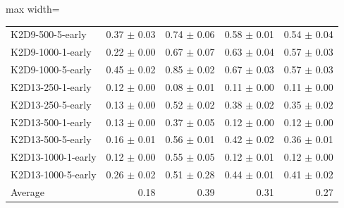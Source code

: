 \documentclass{article}
\begin{document}
\begin{table}[ht]
\begin{center}
\begin{small}
\begin{adjustbox}{max width=\columnwidth}
\begin{tabular}{l|rrrr}
K2D9-500-5-early & 0.37 $\pm$ 0.03 & 0.74 $\pm$ 0.06 & 0.58 $\pm$ 0.01 & 0.54 $\pm$ 0.04\\
K2D9-1000-1-early & 0.22 $\pm$ 0.00 & 0.67 $\pm$ 0.07 & 0.63 $\pm$ 0.04 & 0.57 $\pm$ 0.03\\
K2D9-1000-5-early & 0.45 $\pm$ 0.02 & 0.85 $\pm$ 0.02 & 0.67 $\pm$ 0.03 & 0.57 $\pm$ 0.03\\
K2D13-250-1-early & 0.12 $\pm$ 0.00 & 0.08 $\pm$ 0.01 & 0.11 $\pm$ 0.00 & 0.11 $\pm$ 0.00\\
K2D13-250-5-early & 0.13 $\pm$ 0.00 & 0.52 $\pm$ 0.02 & 0.38 $\pm$ 0.02 & 0.35 $\pm$ 0.02\\
K2D13-500-1-early & 0.13 $\pm$ 0.00 & 0.37 $\pm$ 0.05 & 0.12 $\pm$ 0.00 & 0.12 $\pm$ 0.00\\
K2D13-500-5-early & 0.16 $\pm$ 0.01 & 0.56 $\pm$ 0.01 & 0.42 $\pm$ 0.02 & 0.36 $\pm$ 0.01\\
K2D13-1000-1-early & 0.12 $\pm$ 0.00 & 0.55 $\pm$ 0.05 & 0.12 $\pm$ 0.01 & 0.12 $\pm$ 0.00\\
K2D13-1000-5-early & 0.26 $\pm$ 0.02 & 0.51 $\pm$ 0.28 & 0.44 $\pm$ 0.01 & 0.41 $\pm$ 0.02\\
\midrule
Average & 0.18 & 0.39 & 0.31 & 0.27\\
\end{tabular}
        \end{adjustbox}
    \end{small}
    \end{center}
    \vskip -0.1in
\end{table}
\end{document}
